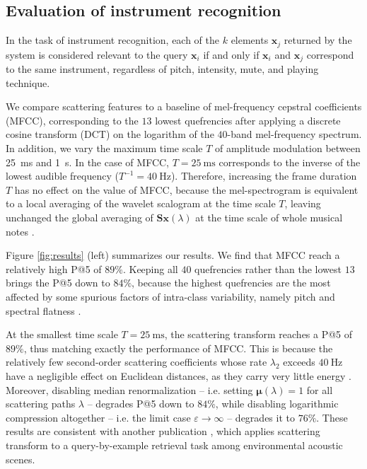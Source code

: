 \documentclass{article}
\makeatletter
\newcommand*{\ie}{i.e.\@\xspace}
\makeatother
\begin{document}
\subsection{Evaluation of instrument recognition}

In the task of instrument recognition, each of the $k$ elements $\boldsymbol{x}_j$ returned by the system is considered relevant to the query $\boldsymbol{x}_i$ if and only if $\boldsymbol{x}_i$ and $\boldsymbol{x}_j$ correspond to the same instrument, regardless of pitch, intensity, mute, and playing technique.

We compare scattering features to a baseline of mel-frequency cepstral coefficients (MFCC), corresponding to the $13$ lowest quefrencies after applying a discrete cosine transform (DCT) on the logarithm of the $40$-band mel-frequency spectrum.
In addition, we vary the maximum time scale $T$ of amplitude modulation between \SI{25}{\milli\second} and  \SI{1}{\second}.
In the case of MFCC, $T=\SI{25}{\milli\second}$ corresponds to the inverse of the lowest audible frequency ($T^{-1}=\SI{40}{\Hz}$).
Therefore, increasing the frame duration $T$ has no effect on the value of MFCC, because the mel-spectrogram is equivalent to a local averaging of the wavelet scalogram at the time scale $T$, leaving unchanged the global averaging of $\mathbf{S}\boldsymbol{x}(\lambda)$ at the time scale of whole musical notes \cite{anden2012dafx}.

Figure \ref{fig:results} (left) summarizes our results.
We find that MFCC reach a relatively high P@5 of $89\%$.
Keeping all $40$ quefrencies rather than the lowest $13$ brings the P@5 down to $84\%$, because the highest quefrencies are the most affected by some spurious factors of intra-class variability, namely pitch and spectral flatness \cite{lostanlen2017phd}.

At the smallest time scale $T=\SI{25}{\milli\second}$, the scattering transform reaches a P@5 of $89\%$, thus matching exactly the performance of MFCC.
This is because the relatively few second-order scattering coefficients whose rate $\lambda_2$ exceeds $\SI{40}{\Hz}$ have a negligible effect on Euclidean distances, as they carry very little energy \cite{anden2014taslp}.
Moreover, disabling median renormalization -- \ie{} setting $\boldsymbol{\mu}(\lambda) = 1$ for all scattering paths $\lambda$ -- degrades P@5 down to $84\%$, while disabling logarithmic compression altogether -- \ie{} the limit case $\varepsilon \rightarrow \infty$ -- degrades it to $76\%$.
These results are consistent with another publication \cite{lostanlen2018eurasip}, which applies scattering transform to a query-by-example retrieval task among environmental acoustic scenes.
\end{document}
